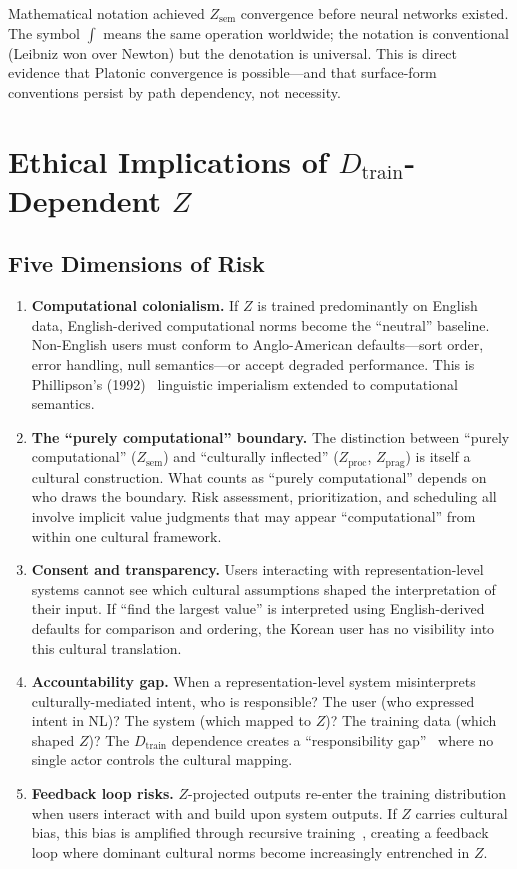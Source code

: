 \documentclass[11pt]{article}
\theoremstyle{definition}
\newcommand{\Zsem}{Z_{\text{sem}}}
\newcommand{\Zproc}{Z_{\text{proc}}}
\newcommand{\Zprag}{Z_{\text{prag}}}
\newcommand{\Dtrain}{D_{\text{train}}}
\begin{document}
Mathematical notation achieved $\Zsem$ convergence before neural networks existed. The symbol $\int$ means the same operation worldwide; the notation is conventional (Leibniz won over Newton) but the denotation is universal. This is direct evidence that Platonic convergence is possible---and that surface-form conventions persist by path dependency, not necessity.

\section{Ethical Implications of $\Dtrain$-Dependent $Z$}\label{app:ethics}

\subsection{Five Dimensions of Risk}

\begin{enumerate}[nosep]
  \item \textbf{Computational colonialism.} If $Z$ is trained predominantly on English data, English-derived computational norms become the ``neutral'' baseline. Non-English users must conform to Anglo-American defaults---sort order, error handling, null semantics---or accept degraded performance. This is Phillipson's (1992)~\cite{phillipson1992} linguistic imperialism extended to computational semantics.

  \item \textbf{The ``purely computational'' boundary.} The distinction between ``purely computational'' ($\Zsem$) and ``culturally inflected'' ($\Zproc$, $\Zprag$) is itself a cultural construction. What counts as ``purely computational'' depends on who draws the boundary. Risk assessment, prioritization, and scheduling all involve implicit value judgments that may appear ``computational'' from within one cultural framework.

  \item \textbf{Consent and transparency.} Users interacting with representation-level systems cannot see which cultural assumptions shaped the interpretation of their input. If ``find the largest value'' is interpreted using English-derived defaults for comparison and ordering, the Korean user has no visibility into this cultural translation.

  \item \textbf{Accountability gap.} When a representation-level system misinterprets culturally-mediated intent, who is responsible? The user (who expressed intent in NL)? The system (which mapped to $Z$)? The training data (which shaped $Z$)? The $\Dtrain$ dependence creates a ``responsibility gap''~\cite{matthias2004} where no single actor controls the cultural mapping.

  \item \textbf{Feedback loop risks.} $Z$-projected outputs re-enter the training distribution when users interact with and build upon system outputs. If $Z$ carries cultural bias, this bias is amplified through recursive training~\cite{shumailov2024collapse}, creating a feedback loop where dominant cultural norms become increasingly entrenched in $Z$.
\end{enumerate}
\end{document}
